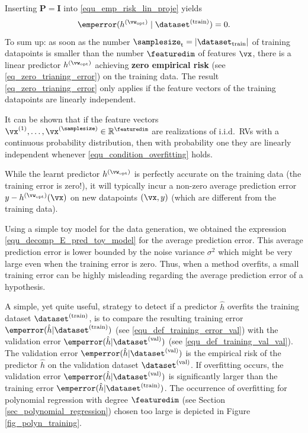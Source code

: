 \documentclass[12pt]{report}
\begin{document}
Inserting $\mathbf{P} = \mathbf{I}$ into \eqref{equ_emp_risk_lin_proje} yields 
\begin{equation}
\label{eq_zero_trianing_error}
\emperror(h^{(\vw_{\rm opt})} \mid \dataset^{(\rm train)}) = 0.
\end{equation} 
To sum up: as soon as the number  $\samplesize_{\rm t} = | \dataset_{\rm train}|$ 
of training datapoints is smaller than the number $\featuredim$ of features $\vx$, there 
is a linear predictor $h^{(\vw_{\rm opt})}$ achieving {\bf zero empirical risk} 
(see \eqref{eq_zero_trianing_error}) on the training data. The result 
\eqref{eq_zero_trianing_error} only applies if the feature vectors of 
the training datapoints are linearly independent. 

It can be shown that if the feature vectors $\vx^{(1)},\ldots,\vx^{(\samplesize)} \in \mathbb{R}^{\featuredim}$ 
are realizations of i.i.d.\ RVs with a continuous probability distribution, 
then with probability one they are linearly independent whenever \eqref{equ_condition_overfitting} holds. 

While the learnt predictor $h^{(\vw_{\rm opt})}$ is perfectly accurate on the training 
data (the training error is zero!), it will typically incur a non-zero average prediction error 
$y - h^{(\vw_{\rm opt})}(\vx)$ on new datapoints $(\vx,y)$ (which are different from the 
training data). 

Using a simple toy model for the data generation, we obtained the expression 
\eqref{equ_decomp_E_pred_toy_model} for the average prediction error. This 
average prediction error is lower bounded by the noise variance $\sigma^{2}$ 
which might be very large even when the training error is zero. Thus, when a 
method overfits, a small training error can be highly misleading regarding the 
average prediction error of a hypothesis. 

A simple, yet quite useful, strategy to detect if a predictor $\hat{h}$ overfits the training 
dataset $\dataset^{(\rm train)}$, is to compare the resulting training error 
$\emperror(\hat{h}| \dataset^{(\rm train)})$ (see \eqref{equ_def_training_error_val}) with the 
validation error $\emperror(\hat{h}| \dataset^{(\rm val)})$ (see \eqref{equ_def_training_val_val}). 
The validation error $\emperror(\hat{h}| \dataset^{(\rm val)})$ is the empirical risk of the predictor 
$\hat{h}$ on the validation dataset $\dataset^{(\rm val)}$. If overfitting occurs, the validation 
error $\emperror(\hat{h}| \dataset^{(\rm val)})$ is significantly larger than the training error 
$\emperror(\hat{h}| \dataset^{(\rm train)})$. The occurrence of overfitting for polynomial regression with 
degree $\featuredim$ (see Section \ref{sec_polynomial_regression}) chosen too large is depicted in 
Figure \ref{fig_polyn_training}. 
\end{document}
